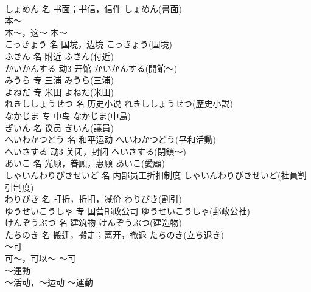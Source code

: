 \documentclass[8pt]{extreport}
\begin{document}
\begin{CJK}{UTF8}{min}
\\	しょめん	名	书面；书信，信件	しょめん(書面)	
\\	本～	
\\	本～，这～	本～	
\\	こっきょう	名	国境，边境	こっきょう(国境)	
\\	ふきん	名	附近	ふきん(付近)	
\\	かいかんする	动3	开馆	かいかんする(開館～)	
\\	みうら	专	三浦	みうら(三浦)	
\\	よねだ	专	米田	よねだ(米田)	
\\	れきししょうせつ	名	历史小说	れきししょうせつ(歴史小説)	
\\	なかじま	专	中岛	なかじま(中島)	
\\	ぎいん	名	议员	ぎいん(議員)	
\\	へいわかつどう	名	和平运动	へいわかつどう(平和活動)	
\\	へいさする	动3	关闭，封闭	へいさする(閉鎖～)	
\\	あいこ	名	光顾，眷顾，惠顾	あいこ(愛顧)	
\\	しゃいんわりびきせいど	名	内部员工折扣制度	しゃいんわりびきせいど(社員割引制度)	
\\	わりびき	名	打折，折扣，减价	わりびき(割引)	
\\	ゆうせいこうしゃ	专	国营邮政公司	ゆうせいこうしゃ(郵政公社)	
\\	けんぞうぶつ	名	建筑物	けんぞうぶつ(建造物)	
\\	たちのき	名	搬迁，搬走；离开，撤退	たちのき(立ち退き)	
\\	～可	
\\	可～，可以～	～可	
\\	～運動	
\\	～活动，～运动	～運動	
\end{CJK}
\end{document}
